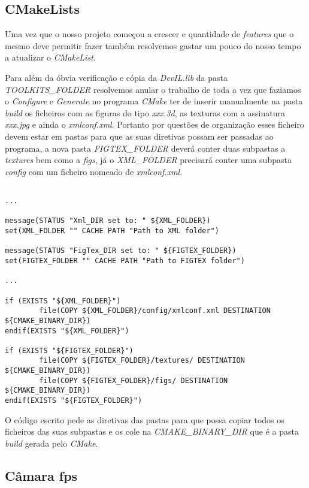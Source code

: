 \documentclass[11pt,a4paper]{report}
\begin{document}
\subsection{CMakeLists}

Uma vez que o nosso projeto começou a crescer e quantidade de \emph{features} que o mesmo deve permitir fazer também resolvemos gastar um pouco do nosso tempo a atualizar o \emph{CMakeList}. 

Para além da óbvia verificação e cópia da \emph{DevIL.lib} da pasta \emph{TOOLKITS\_FOLDER} resolvemos anular o trabalho de toda a vez que faziamos o \emph{Configure} e \emph{Generate} no programa \emph{CMake} ter de inserir manualmente na pasta \emph{build} os ficheiros com as figuras do tipo \emph{xxx.3d}, as texturas com a assinatura \emph{xxx.jpg} e ainda o \emph{xmlconf.xml}. Portanto por questões de organização esses ficheiro devem estar em pastas para que as suas diretivas possam ser passadas ao programa, a nova pasta \emph{FIGTEX\_FOLDER} deverá conter duas subpastas a \emph{textures} bem como a \emph{figs}, já o \emph{XML\_FOLDER} precisará conter uma subpasta \emph{config} com um ficheiro nomeado de \emph{xmlconf.xml}.
\begin{lstlisting}[style = cmake]

...

message(STATUS "Xml_DIR set to: " ${XML_FOLDER})
set(XML_FOLDER "" CACHE PATH "Path to XML folder")

message(STATUS "FigTex_DIR set to: " ${FIGTEX_FOLDER})
set(FIGTEX_FOLDER "" CACHE PATH "Path to FIGTEX folder")

...

if (EXISTS "${XML_FOLDER}")
		file(COPY ${XML_FOLDER}/config/xmlconf.xml DESTINATION ${CMAKE_BINARY_DIR})
endif(EXISTS "${XML_FOLDER}")

if (EXISTS "${FIGTEX_FOLDER}")
	    file(COPY ${FIGTEX_FOLDER}/textures/ DESTINATION ${CMAKE_BINARY_DIR})
	    file(COPY ${FIGTEX_FOLDER}/figs/ DESTINATION ${CMAKE_BINARY_DIR})
endif(EXISTS "${FIGTEX_FOLDER}")

\end{lstlisting}

O código escrito pede as diretivas das pastas para que possa copiar todos os ficheiros das suas subpastas e os cole na \emph{CMAKE\_BINARY\_DIR} que é a pasta \emph{build} gerada pelo \emph{CMake}.
\newpage
\subsection{Câmara fps}
\end{document}
